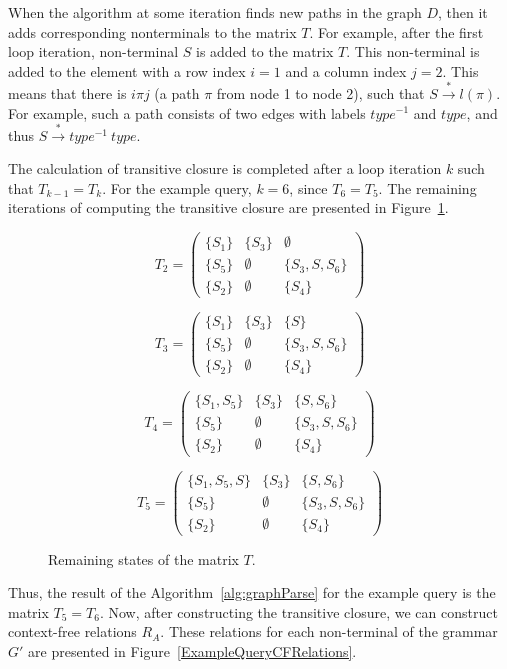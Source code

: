 When the algorithm at some iteration finds new paths in the graph $D$, then it adds corresponding nonterminals to the matrix $T$. For example, after the first loop iteration, non-terminal $S$ is added to the matrix $T$. This non-terminal is added to the element with a row index $i = 1$ and a column index $j = 2$. This means that there is $i\pi j$ (a path $\pi$ from node 1 to node 2), such that $S \xrightarrow{*} l(\pi)$. For example, such a path consists of two edges with labels $type^{-1}$ and $type$, and thus $S \xrightarrow{*} type^{-1} \ type$.

The calculation of transitive closure is completed after a loop iteration $k$ such that $T_{k-1} = T_k$. For the example query, $k = 6$, since $T_6 = T_5$. The remaining iterations of computing the transitive closure are presented in Figure~\ref{ExampleQueryFinalIterations}.

\begin{figure}[h]
\[
T_2 = \begin{pmatrix}
    \{S_1\} & \{S_3\} & \emptyset \\ \{S_5\} & \emptyset & \{S_3, S, S_6\} \\ \{S_2\} & \emptyset & \{S_4\}
\end{pmatrix}
\]

\[
T_3 = \begin{pmatrix}
    \{S_1\} & \{S_3\} & \{S\} \\ \{S_5\} & \emptyset & \{S_3, S, S_6\} \\ \{S_2\} & \emptyset & \{S_4\}
\end{pmatrix}
\]

\[
T_4 = \begin{pmatrix}
    \{S_1, S_5\} & \{S_3\} & \{S, S_6\} \\ \{S_5\} & \emptyset & \{S_3, S, S_6\} \\ \{S_2\} & \emptyset & \{S_4\}
\end{pmatrix}
\]

\[
T_5 = \begin{pmatrix}
    \{S_1, S_5, S\} & \{S_3\} & \{S, S_6\} \\ \{S_5\} & \emptyset & \{S_3, S, S_6\} \\ \{S_2\} & \emptyset & \{S_4\}
\end{pmatrix}
\]
\caption{Remaining states of the matrix $T$.}
\label{ExampleQueryFinalIterations}
\end{figure}

Thus, the result of the Algorithm~\ref{alg:graphParse} for the example query is the matrix $T_5 = T_6$. Now, after constructing the transitive closure, we can construct context-free relations $R_A$. These relations for each non-terminal of the grammar $G'$ are presented in Figure~\ref{ExampleQueryCFRelations}.

